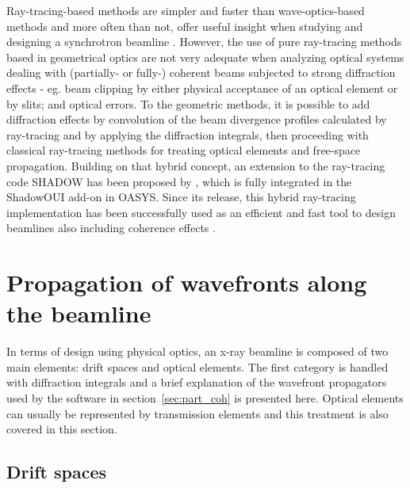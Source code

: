 \documentclass{iucr}              %
\begin{document}
Ray-tracing-based methods are simpler and faster than wave-optics-based methods and more often than not, offer useful insight when studying and designing a synchrotron beamline \cite{hierarchical}. However, the use of pure ray-tracing methods based in geometrical optics are not very adequate when analyzing optical systems dealing with (partially- or fully-) coherent beams subjected to strong diffraction effects - eg. beam clipping by either physical acceptance of an optical element or by slits; and optical errors. To the geometric methods, it is possible to add diffraction effects by convolution of the beam divergence profiles calculated by ray-tracing and by applying the diffraction integrals, then proceeding with classical ray-tracing methods for treating optical elements and free-space propagation. Building on that hybrid concept, an extension to the ray-tracing code SHADOW \cite{codeSHADOW} has been proposed by , which is fully integrated in the ShadowOUI \cite{codeSHADOWOUI} add-on in OASYS. Since its release, this hybrid ray-tracing implementation has been successfully used as an efficient and fast tool to design beamlines also including coherence effects \cite{Shi2017,Luca2020, Lordano2022}.

\section{Propagation of wavefronts along the beamline}
 \newline

In terms of design using physical optics, an x-ray beamline is composed of two main elements: drift spaces and optical elements. The first category is handled with diffraction integrals and a brief explanation of the wavefront propagators used by the software in section~\ref{sec:part_coh} is presented here. Optical elements can usually be represented by transmission elements and this treatment is also covered in this section. 

\subsection{Drift spaces}\label{sec:free_space}
\end{document}
